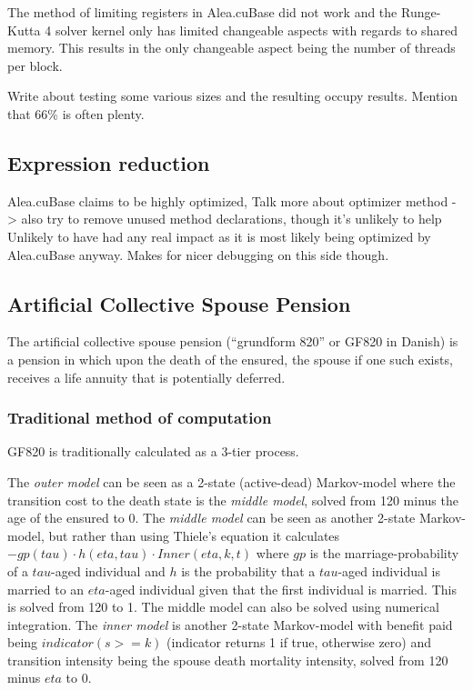 The method of limiting registers in Alea.cuBase did not work and the Runge-Kutta 4 solver kernel only has limited changeable aspects with regards to shared memory.
This results in the only changeable aspect being the number of threads per block.

Write about testing some various sizes and the resulting occupy results. Mention that 66\% is often plenty.


\subsection{Expression reduction}\label{subsec:exprReduction}
Alea.cuBase claims to be highly optimized,
Talk more about optimizer method -> also try to remove unused method declarations, though it's unlikely to help
Unlikely to have had any real impact as it is most likely being optimized by Alea.cuBase anyway. Makes for nicer debugging on this side though.

\subsection{Artificial Collective Spouse Pension}
The artificial collective spouse pension (``grundform 820'' or GF820 in Danish) is a pension in which upon the death of the ensured, the spouse if one such exists, receives a life annuity that is potentially deferred.

\subsubsection{Traditional method of computation}
GF820 is traditionally calculated as a 3-tier process.

The \emph{outer model} can be seen as a 2-state (active-dead) Markov-model where the transition cost to the death state is the \emph{middle model}, solved from 120 minus the age of the ensured to 0.
The \emph{middle model} can be seen as another 2-state Markov-model, but rather than using Thiele's equation it calculates $-gp(tau) \cdot h(eta, tau) \cdot Inner(eta, k, t)$ where $gp$ is the marriage-probability of a $tau$-aged individual and $h$ is the probability that a $tau$-aged individual is married to an $eta$-aged individual given that the first individual is married.
This is solved from 120 to 1. The middle model can also be solved using numerical integration.
The \emph{inner model} is another 2-state Markov-model with benefit paid being $indicator(s >= k)$ (indicator returns 1 if true, otherwise zero) and transition intensity being the spouse death mortality intensity, solved from 120 minus $eta$ to 0.

